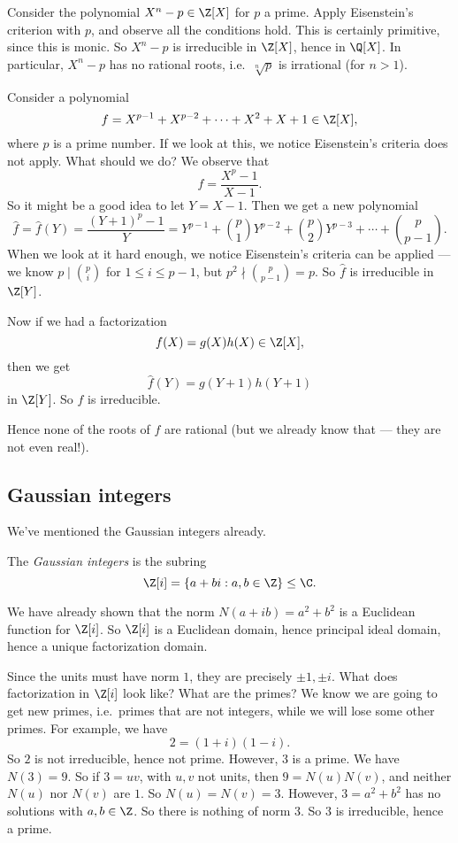 \documentclass[a4paper]{article}
\begin{document}
\begin{eg}
  Consider the polynomial $X^n - p \in \Z[X]$ for $p$ a prime. Apply Eisenstein's criterion with $p$, and observe all the conditions hold. This is certainly primitive, since this is monic. So $X^n - p$ is irreducible in $\Z[X]$, hence in $\Q[X]$. In particular, $X^n - p$ has no rational roots, i.e.\ $\sqrt[n]{p}$ is irrational (for $n > 1$).
\end{eg}

\begin{eg}
  Consider a polynomial
  \[
    f = X^{p - 1} + X^{p - 2} + \cdots + X^2 + X + 1 \in \Z[X],
  \]
  where $p$ is a prime number. If we look at this, we notice Eisenstein's criteria does not apply. What should we do? We observe that
  \[
    f = \frac{X^p - 1}{X - 1}.
  \]
  So it might be a good idea to let $Y = X - 1$. Then we get a new polynomial
  \[
    \hat{f} = \hat{f}(Y) = \frac{(Y + 1)^p - 1}{Y} = Y^{p - 1} + \binom{p}{1} Y^{p - 2} + \binom{p}{2} Y^{p - 3} + \cdots + \binom{p}{p - 1}.
  \]
  When we look at it hard enough, we notice Eisenstein's criteria can be applied --- we know $p \mid \binom{p}{i}$ for $1 \leq i \leq p - 1$, but $p^2 \nmid \binom{p}{p - 1} = p$. So $\hat{f}$ is irreducible in $\Z[Y]$.

  Now if we had a factorization
  \[
    f(X) = g(X)h(X) \in \Z[X],
  \]
  then we get
  \[
    \hat{f}(Y) = g(Y + 1)h(Y + 1)
  \]
  in $\Z[Y]$. So $f$ is irreducible.

  Hence none of the roots of $f$ are rational (but we already know that --- they are not even real!).
\end{eg}

\subsection{Gaussian integers}
We've mentioned the Gaussian integers already.
\begin{defi}
  The \emph{Gaussian integers} is the subring
  \[
    \Z[i] = \{a + bi: a, b\in \Z\} \leq \C.
  \]
\end{defi}

We have already shown that the norm $N(a + ib) = a^2 + b^2$ is a Euclidean function for $\Z[i]$. So $\Z[i]$ is a Euclidean domain, hence principal ideal domain, hence a unique factorization domain.

Since the units must have norm $1$, they are precisely $\pm 1, \pm i$. What does factorization in $\Z[i]$ look like? What are the primes? We know we are going to get new primes, i.e.\ primes that are not integers, while we will lose some other primes. For example, we have
\[
  2 = (1 + i)(1 - i).
\]
So $2$ is not irreducible, hence not prime. However, $3$ is a prime. We have $N(3) = 9$. So if $3 = uv$, with $u, v$ not units, then $9 = N(u)N(v)$, and neither $N(u)$ nor $N(v)$ are $1$. So $N(u) = N(v) = 3$. However, $3 = a^2 + b^2$ has no solutions with $a, b \in \Z$. So there is nothing of norm $3$. So $3$ is irreducible, hence a prime.
\end{document}
